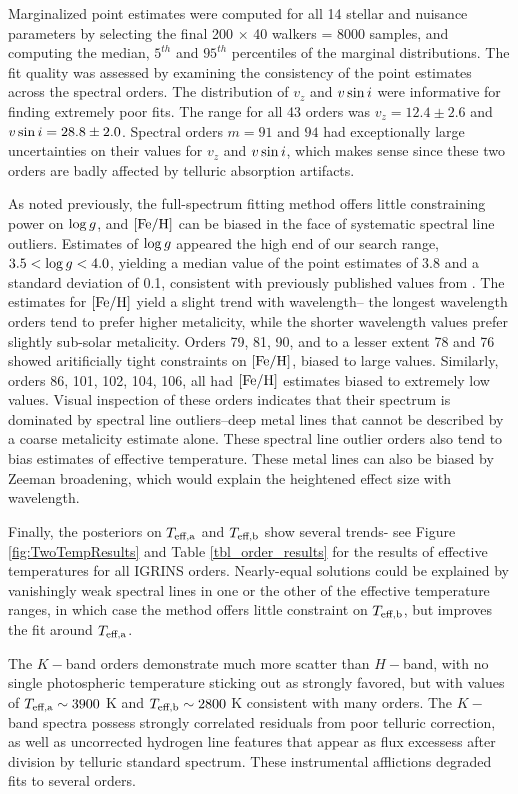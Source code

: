 \documentclass[twocolumn]{emulateapj}%
\begin{document}
Marginalized point estimates were computed for all 14 stellar and nuisance parameters by selecting the final 200 $\times$ 40 walkers = 8000 samples, and computing the median, $5^{th}$ and $95^{th}$ percentiles of the marginal distributions.  The fit quality was assessed by examining the consistency of the point estimates across the spectral orders.  The distribution of $v_z$ and $v \sin i$ were informative for finding extremely poor fits.  The range for all 43 orders was $v_z = 12.4 \pm 2.6$ and $v \sin i = 28.8 \pm 2.0$.  Spectral orders $m=91$ and $94$ had exceptionally large uncertainties on their values for $v_z$ and $v \sin i$, which makes sense since these two orders are badly affected by telluric absorption artifacts.

As noted previously, the full-spectrum fitting method offers little constraining power on $\log g$, and $[{\rm Fe}/{\rm H}]$ can be biased in the face of systematic spectral line outliers.  Estimates of $\log g$ appeared the high end of our search range, $3.5 <\log g <4.0$, yielding a median value of the point estimates of 3.8 and a standard deviation of 0.1, consistent with previously published values from \citet{donati14}.  The estimates for $[{\rm Fe}/{\rm H}]$ yield a slight trend with wavelength-- the longest wavelength orders tend to prefer higher metalicity, while the shorter wavelength values prefer slightly sub-solar metalicity.  Orders 79, 81, 90, and to a lesser extent 78 and 76 showed aritificially tight constraints on $[{\rm Fe}/{\rm H}]$, biased to large values.  Similarly, orders 86, 101, 102, 104, 106, all had $[{\rm Fe}/{\rm H}]$ estimates biased to extremely low values.   Visual inspection of these orders indicates that their spectrum is dominated by spectral line outliers--deep metal lines that cannot be described by a coarse metalicity estimate alone.  These spectral line outlier orders also tend to bias estimates of effective temperature.  These metal lines can also be biased by Zeeman broadening, which would explain the heightened effect size with wavelength.

Finally, the posteriors on $T_\textrm{eff,a}$ and $T_\textrm{eff,b}$ show several trends- see Figure \ref{fig:TwoTempResults} and Table \ref{tbl_order_results} for the results of effective temperatures for all IGRINS orders.  
Nearly-equal solutions could be explained by vanishingly weak spectral lines in one or the other of the effective temperature ranges, in which case the method offers little constraint on $T_\textrm{eff,b}$, but improves the fit around $T_\textrm{eff,a}$.  

The $K-$band orders demonstrate much more scatter than $H-$band, with no single photospheric temperature sticking out as strongly favored, but with values of $T_\textrm{eff,a} \sim 3900$ K and $T_\textrm{eff,b} \sim 2800$ K consistent with many orders.  The $K-$band spectra possess strongly correlated residuals from poor telluric correction, as well as uncorrected hydrogen line features that appear as flux excessess after division by telluric standard spectrum.  These instrumental afflictions degraded fits to several orders.
\end{document}
